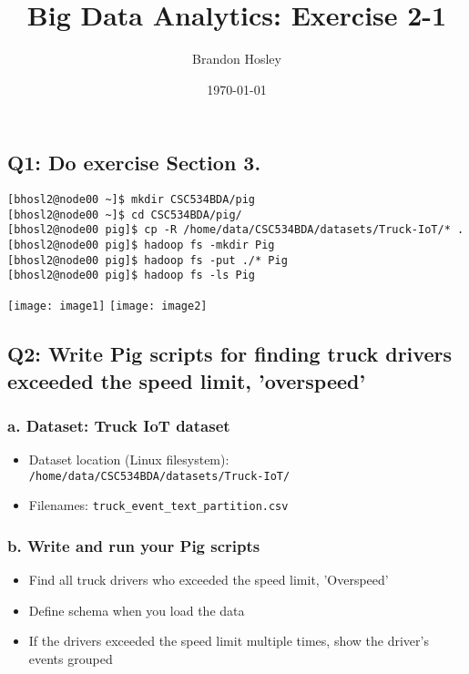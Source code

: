 \documentclass[]{article}
\title{Big Data Analytics: Exercise 2-1}
\author{Brandon Hosley}
\date{\today}
\begin{document}
\maketitle

\subsection*{Q1: Do exercise Section 3.} 

\begin{verbatim}
[bhosl2@node00 ~]$ mkdir CSC534BDA/pig
[bhosl2@node00 ~]$ cd CSC534BDA/pig/
[bhosl2@node00 pig]$ cp -R /home/data/CSC534BDA/datasets/Truck-IoT/* .
[bhosl2@node00 pig]$ hadoop fs -mkdir Pig
[bhosl2@node00 pig]$ hadoop fs -put ./* Pig
[bhosl2@node00 pig]$ hadoop fs -ls Pig
\end{verbatim}
\texttt{[image: image1]} %
\texttt{[image: image2]} 

\subsection*{Q2: Write Pig scripts for finding truck drivers exceeded the speed limit, 'overspeed'}
\subsubsection*{a. Dataset: Truck IoT dataset}
\begin{itemize}[before=\itshape,font=\normalfont]
	\item Dataset location (Linux filesystem): \\
	\texttt{/home/data/CSC534BDA/datasets/Truck-IoT/}
	\item Filenames: 
	\texttt{truck_event_text_partition.csv}
\end{itemize} 

\subsubsection*{b. Write and run your Pig scripts}
\begin{itemize}[before=\itshape,font=\normalfont]
	\item Find all truck drivers who exceeded the speed limit, 'Overspeed'
	\item Define schema when you load the data
	\item If the drivers exceeded the speed limit multiple times, show the driver’s
	events grouped
\end{itemize} 
\end{document}
